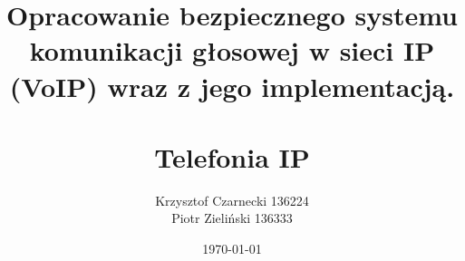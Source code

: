 \documentclass[12pt,a4paper]{article}
\begin{document}
    \title{Opracowanie bezpiecznego systemu komunikacji głosowej
    w sieci IP (VoIP) wraz z jego implementacją.
        \\ \\ Telefonia IP}

    \author{Krzysztof Czarnecki 136224\\Piotr Zieliński 136333}
    \date{\today}
    \maketitle
    \newpage
    \tableofcontents

    
    
    
    
\end{document}
